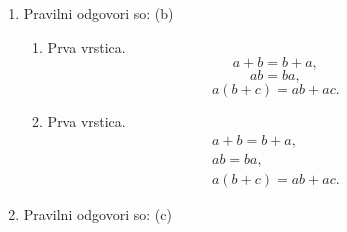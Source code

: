 \documentclass[11pt]{article}
\begin{document}
\begin{enumerate}
    \item Pravilni odgovori so: (b)
    \begin{enumerate}
        \item Prva vrstica.
\[ a + b = b + a, \]
\[ a b = b a, \]
\[ a (b + c) = a b + a c. \]
        \item Prva vrstica.
\begin{gather*}
  a + b = b + a, \\
  a b = b a, \\
  a (b + c) = a b + a c.
\end{gather*}
    \end{enumerate}

    \item Pravilni odgovori so: (c)

\end{enumerate}
\end{document}
